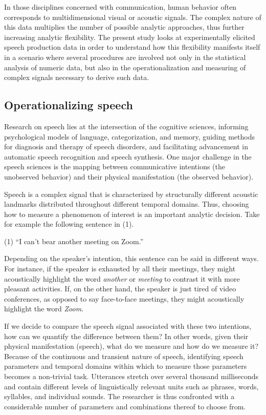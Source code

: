 \documentclass[Review,times,sageh]{sagej}
\begin{document}
In those disciplines concerned with communication, human behavior often
corresponds to multidimensional visual or acoustic signals. The complex
nature of this data multiplies the number of possible analytic
approaches, thus further increasing analytic flexibility. The present
study looks at experimentally elicited speech production data in order
to understand how this flexibility manifests itself in a scenario where
several procedures are involved not only in the statistical analysis of
numeric data, but also in the operationalization and measuring of
complex signals necessary to derive such data.

\hypertarget{s:operspeech}{\subsection{Operationalizing
speech}\label{s:operspeech}}

Research on speech lies at the intersection of the cognitive sciences,
informing psychological models of language, categorization, and memory,
guiding methods for diagnosis and therapy of speech disorders, and
facilitating advancement in automatic speech recognition and speech
synthesis. One major challenge in the speech sciences is the mapping
between communicative intentions (the unobserved behavior) and their
physical manifestation (the observed behavior).

Speech is a complex signal that is characterized by structurally
different acoustic landmarks distributed throughout different temporal
domains. Thus, choosing how to measure a phenomenon of interest is an
important analytic decision. Take for example the following sentence in
(1).

\vspace{1em} (1) ``I can't bear another meeting on Zoom.'' \vspace{1em}

Depending on the speaker's intention, this sentence can be said in
different ways. For instance, if the speaker is exhausted by all their
meetings, they might acoustically highlight the word \emph{another} or
\emph{meeting} to contrast it with more pleasant activities. If, on the
other hand, the speaker is just tired of video conferences, as opposed
to say face-to-face meetings, they might acoustically highlight the word
\emph{Zoom}.

If we decide to compare the speech signal associated with these two
intentions, how can we quantify the difference between them? In other
words, given their physical manifestation (speech), what do we measure
and how do we measure it? Because of the continuous and transient nature
of speech, identifying speech parameters and temporal domains within
which to measure those parameters becomes a non-trivial task. Utterances
stretch over several thousand milliseconds and contain different levels
of linguistically relevant units such as phrases, words, syllables, and
individual sounds. The researcher is thus confronted with a considerable
number of parameters and combinations thereof to choose from.
\end{document}
